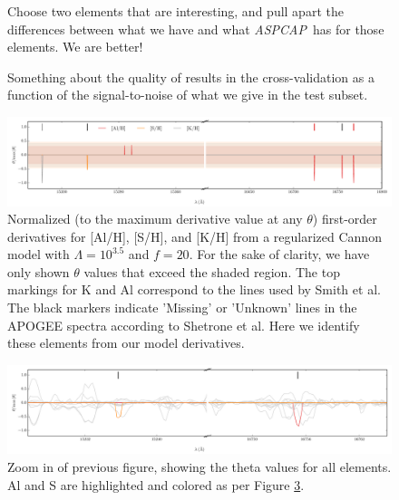 \documentclass[12pt,preprint]{aastex}
\newcommand{\project}[1]{\textsl{#1}}
\newcommand{\acronym}[1]{{\small{#1}}}
\newcommand{\aspcap}{\project{\acronym{ASPCAP}}}
\begin{document}
\begin{figure}[p]
\caption{Choose two elements that are interesting, and pull apart the
  differences between what we have and what \aspcap\ has for those
  elements.  We are better!\label{fig:elements}}
\end{figure}

\begin{figure}[p]
\caption{Something about the quality of results in the
  cross-validation as a function of the signal-to-noise of what we
  give in the test subset.\label{fig:snr}}
\end{figure}


\begin{figure}[p]
\includegraphics[width=\textwidth]{sparse-first-order-coefficients.pdf}
\caption{Normalized (to the maximum derivative value at any $\theta$) first-order derivatives for [Al/H], [S/H], and [K/H] from a regularized Cannon model with $\Lambda = 10^{3.5}$ and $f = 20$. For the sake of clarity, we have only shown $\theta$ values that exceed the shaded region. The top markings for K and Al correspond to the lines used by Smith et al. The black markers indicate 'Missing' or 'Unknown' lines in the APOGEE spectra according to Shetrone et al. Here we identify these elements from our model derivatives.  \label{fig:inferring-lines}}
\end{figure}

\begin{figure}[p]
\includegraphics[width=\textwidth]{sparse-first-order-coefficients-zoom.pdf}
\caption{Zoom in of previous figure, showing the theta values for all elements. Al and S are highlighted and colored as per Figure \ref{fig:inferring-lines}.\label{fig:inferring-lines2}}
\end{figure}
\end{document}
